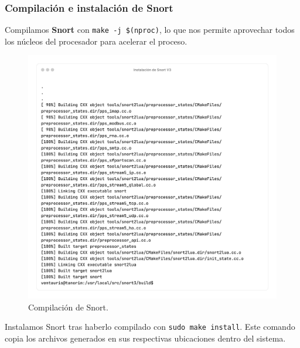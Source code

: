 \documentclass[11pt,a4paper,twoside]{report}
\begin{document}
\newpage

\subsubsection*{Compilación e instalación de Snort}

Compilamos \textbf{Snort} con \texttt{make -j \$(nproc)}, lo que nos permite aprovechar todos los núcleos del procesador para acelerar el proceso.

\begin{figure}[H]
	\centering
	\includegraphics[scale=0.12]{instalacion_snort/22-22.png}
	\caption{Compilación de Snort.}
\end{figure}

\newpage

Instalamos Snort tras haberlo compilado con \texttt{sudo make install}. Este comando copia los archivos generados en sus respectivas ubicaciones dentro del sistema.
\end{document}
